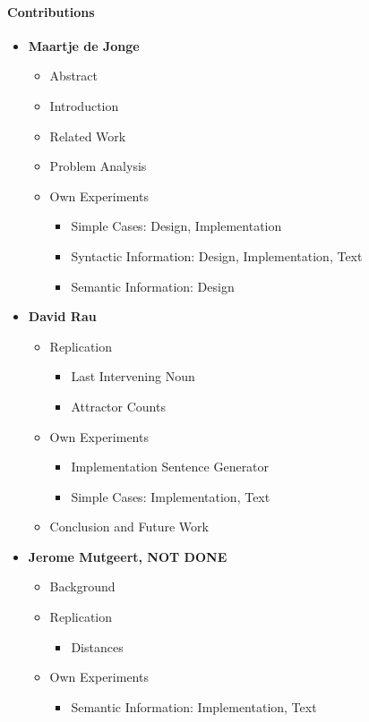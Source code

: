 \paragraph{Contributions}

\begin{itemize}
  \item \textbf{Maartje de Jonge}
  \begin{itemize}
    \item Abstract
    \item Introduction
    \item Related Work
    \item Problem Analysis
    \item Own Experiments
    \begin{itemize}
       \item Simple Cases: Design, Implementation
       \item Syntactic Information: Design, Implementation, Text
       \item Semantic Information: Design
    \end{itemize}        
  \end{itemize}

  \item \textbf{David Rau}
    \begin{itemize}
      \item Replication
      \begin{itemize}
         \item Last Intervening Noun
         \item Attractor Counts
      \end{itemize}
    \item Own Experiments
    \begin{itemize}
       \item Implementation Sentence Generator
       \item Simple Cases: Implementation, Text
    \end{itemize}        
      \item Conclusion and Future Work
  \end{itemize}

  \item \textbf{Jerome Mutgeert, NOT DONE}
   \begin{itemize}
      \item Background
      \item Replication
      \begin{itemize}
         \item Distances
      \end{itemize}
    \item Own Experiments
    \begin{itemize}
       \item Semantic Information: Implementation, Text
    \end{itemize}        
   \end{itemize}

\end{itemize}


